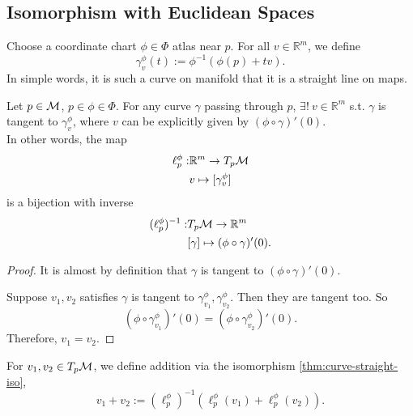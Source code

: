 \documentclass[../main.tex]{subfiles}
\begin{document}
    \subsection{Isomorphism with Euclidean Spaces}
    \begin{definition}\label{def:map-straight}
        Choose a coordinate chart \(\phi \in \Phi\) atlas near \(p\). 
        For all \(v \in \mathbb{R}^m\), we define 
        \[
        \gamma_v^\phi(t) := \phi ^{-1}(\phi(p)+tv).
        \]
        In simple words, it is such a curve on manifold that it is a straight line 
        on maps.
    \end{definition}
    \begin{theorem}\label{thm:curve-straight-iso}
        Let \(p \in \manifold[M]\), \(p \in \phi \in \Phi\). For any curve 
        \(\gamma\) passing through \(p\), \(\exists!~v \in \mathbb{R}^m\) s.t. 
        \(\gamma\) is tangent to \(\gamma_v^\phi\), where \(v\) can be explicitly 
        given by \((\phi \circ \gamma)'(0)\). \\
        In other words, the map
        \[
        \begin{aligned}
            \ell_p^\phi : & \mathbb{R}^m \to T_p\manifold[M] \\
                          & v \mapsto [\gamma_v^\phi]
        \end{aligned}
        \]
        is a bijection with inverse 
        \[
        \begin{aligned}
            (\ell_p^\phi) ^{-1} : & T_p\manifold[M] \to \mathbb{R}^m \\
                          & [\gamma] \mapsto (\phi \circ \gamma)'(0).
        \end{aligned}
        \]
    \end{theorem}
    \begin{proof}
        It is almost by definition that \(\gamma\) is tangent to 
        \((\phi \circ \gamma)'(0)\). \par
        Suppose \(v_1, v_2\) satisfies \(\gamma\) is tangent to 
        \(\gamma_{v_1}^\phi, \gamma_{v_2}^\phi\). Then they are tangent too. So 
        \[
        (\phi \circ \gamma_{v_1}^\phi)'(0) = (\phi \circ \gamma_{v_2}^\phi)'(0).
        \]
        Therefore, \(v_1=v_2\).
    \end{proof}
    \begin{definition}\label{def:curve-add-alt}
        For \(v_1, v_2 \in T_p\manifold[M]\), we define addition via the isomorphism 
        \cref{thm:curve-straight-iso}, 
        \[
        v_1 + v_2 := (\ell_p^\phi)^{-1}(\ell_p^\phi(v_1)+\ell_p^\phi(v_2)).
        \]
    \end{definition}
\end{document}
